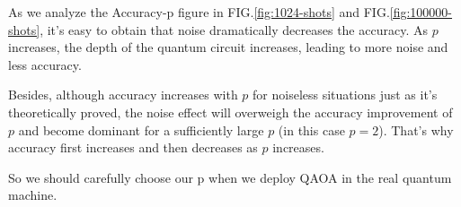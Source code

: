 As we analyze the Accuracy-p figure in FIG.\ref{fig:1024-shots} and  FIG.\ref{fig:100000-shots}, it's easy to obtain that noise dramatically decreases the accuracy. As $p$ increases, the depth of the quantum circuit increases, leading to more noise and less accuracy. 

Besides, although  accuracy increases with $p$ for noiseless situations just as it's theoretically proved, the noise effect will overweigh the accuracy improvement of $p$ and become dominant for a sufficiently large $p$ (in this case $p=2$). That's why accuracy first increases and then decreases as $p$ increases.

So we should carefully choose our p when we deploy QAOA in the real quantum machine.




    
    

    
    

